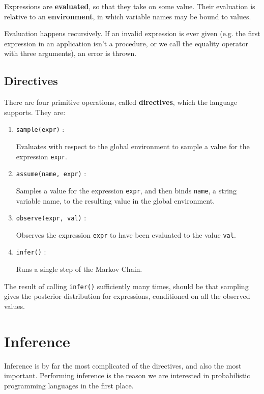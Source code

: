 \documentclass[11pt]{article}
\begin{document}
Expressions are {\bf evaluated}, so that they take on some value.  Their evaluation is relative to an {\bf environment}, in which variable names may be bound to values.  

Evaluation happens recursively.  If an invalid expression is ever given (e.g. the first expression in an application isn't a procedure, or we call the equality operator with three arguments), an error is thrown.  

\subsection{Directives}

There are four primitive operations, called {\bf directives}, which the language supports.  They are:

\begin{enumerate}
\item {\tt sample(expr)} : 

Evaluates with respect to the global environment to sample a value for the expression {\tt expr}.

\item {\tt assume(name, expr)} : 

Samples a value for the expression {\tt expr}, and then binds {\tt name}, a string variable name, to the resulting value in the global environment.

\item {\tt observe(expr, val)} : 

Observes the expression {\tt expr} to have been evaluated to the value {\tt val}.

\item {\tt infer()} : 

Runs a single step of the Markov Chain.  

\end{enumerate}

The result of calling {\tt infer()} sufficiently many times, should be that sampling gives the posterior distribution for expressions, conditioned on all the observed values.  

\section{Inference}

Inference is by far the most complicated of the directives, and also the most important.  Performing inference is the reason we are interested in probabilistic programming languages in the first place.  
\end{document}
